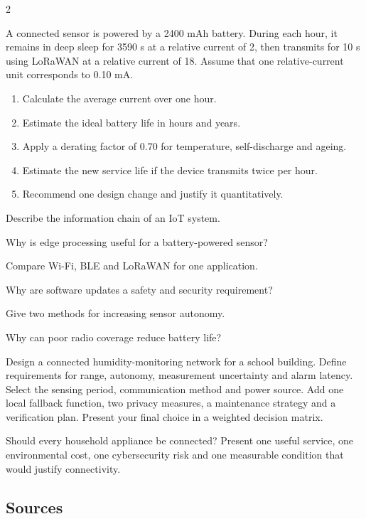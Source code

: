 \begin{multicols}{2}
\begin{applicationexercise}
A connected sensor is powered by a 2400 mAh battery. During each hour, it remains in deep sleep for
3590 s at a relative current of 2, then transmits for 10 s using LoRaWAN at a relative current of 18.
Assume that one relative-current unit corresponds to 0.10 mA.
\begin{enumerate}
\item Calculate the average current over one hour.
\item Estimate the ideal battery life in hours and years.
\item Apply a derating factor of 0.70 for temperature, self-discharge and ageing.
\item Estimate the new service life if the device transmits twice per hour.
\item Recommend one design change and justify it quantitatively.
\end{enumerate}
\end{applicationexercise}

\begin{questions}
\item Describe the information chain of an IoT system.
\item Why is edge processing useful for a battery-powered sensor?
\item Compare Wi-Fi, BLE and LoRaWAN for one application.
\item Why are software updates a safety and security requirement?
\item Give two methods for increasing sensor autonomy.
\item Why can poor radio coverage reduce battery life?
\end{questions}

\begin{engineeringchallenge}
Design a connected humidity-monitoring network for a school building. Define requirements for range,
autonomy, measurement uncertainty and alarm latency. Select the sensing period, communication method
and power source. Add one local fallback function, two privacy measures, a maintenance strategy and a
verification plan. Present your final choice in a weighted decision matrix.
\end{engineeringchallenge}

\begin{speaking}
Should every household appliance be connected? Present one useful service, one environmental cost,
one cybersecurity risk and one measurable condition that would justify connectivity.
\end{speaking}
\end{multicols}

\subsection*{Sources}
